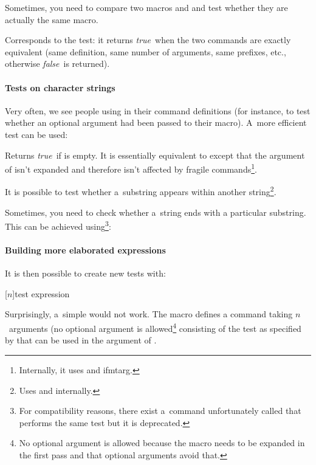 \documentclass{article}
\makeatletter
\newcommand*{\1}{$_1\m@th$}
\newcommand*{\2}{$_2\m@th$}
\newcommand*{\pack}{\textsf}
\newcommand*{\true}{\emph{true}}
\newcommand*{\false}{\emph{false}}
\makeatother
\begin{document}
Sometimes, you need to compare two macros  and  and
test whether they are actually the same macro.
%
\begin{texcode}
  \cmd[syntax,2]{isequivalentto}{command\1}{command\2}
\end{texcode}
%
Corresponds to the  test: it returns \true\ when the two
commands are exactly equivalent (same definition, same number of
arguments, same prefixes, etc., otherwise \false\ is returned).

\paragraph{Tests on character strings}

Very often, we see people using  in their command
definitions (for instance, to test whether an optional argument had
been passed to their macro).  A~more efficient test can be used:
%
\begin{texcode}
\end{texcode}
%
Returns \true\ if  is empty.  It is essentially equivalent to
 except that the argument of
 isn't expanded and therefore isn't affected by fragile
commands\footnote{Internally, it uses  and \pack{ifmtarg}.}.

It is possible to test whether a~substring appears within another
string\footnote{Uses  and  internally.}.
%
\begin{texcode}
\end{texcode}

Sometimes, you need to check whether a~string ends with a particular
substring.  This can be achieved using\footnote{For compatibility
  reasons, there exist a~command unfortunately called
   that performs the same test but it is
  deprecated.}:
%
\begin{texcode}
\end{texcode}

\paragraph{Building more elaborated expressions}

It is then possible to create new tests with:
%
\begin{texcode}
  [$n$]{test expression}
\end{texcode}
%
Surprisingly, a~simple  would not work.  The
 macro defines a command  taking
$n$~arguments (no optional argument is allowed\footnote{No optional
  argument is allowed because the macro needs to be expanded in the
  first pass and that optional arguments avoid that.} consisting of
the test as specified by  that can be used in
the argument of .
\end{document}
